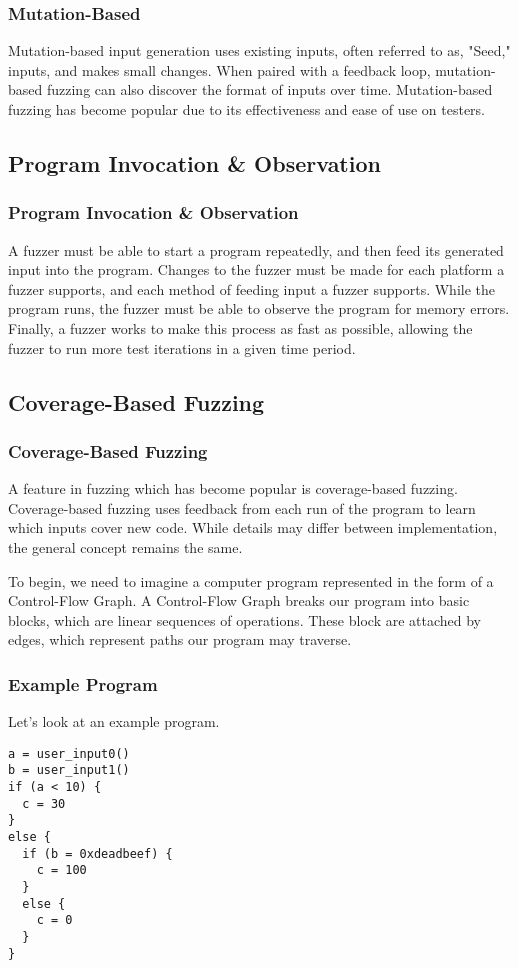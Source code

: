 \documentclass{beamer}
\begin{document}
\begin{frame}[fragile]
\frametitle{Mutation-Based}
Mutation-based input generation uses existing inputs, often referred to as, "Seed," inputs, and makes small changes. When paired with a feedback loop, mutation-based fuzzing can also discover the format of inputs over time. Mutation-based fuzzing has become popular due to its effectiveness and ease of use on testers.
\end{frame}


\subsection{Program Invocation {\&} Observation}
\begin{frame}
\frametitle{Program Invocation {\&} Observation}
A fuzzer must be able to start a program repeatedly, and then feed its generated input into the program. Changes to the fuzzer must be made for each platform a fuzzer supports, and each method of feeding input a fuzzer supports. While the program runs, the fuzzer must be able to observe the program for memory errors. Finally, a fuzzer works to make this process as fast as possible, allowing the fuzzer to run more test iterations in a given time period.
\end{frame}


\subsection{Coverage-Based Fuzzing}
\begin{frame}
\frametitle{Coverage-Based Fuzzing}
A feature in fuzzing which has become popular is coverage-based fuzzing. Coverage-based fuzzing uses feedback from each run of the program to learn which inputs cover new code. While details may differ between implementation, the general concept remains the same.

To begin, we need to imagine a computer program represented in the form of a Control-Flow Graph. A Control-Flow Graph breaks our program into basic blocks, which are linear sequences of operations. These block are attached by edges, which represent paths our program may traverse.
\end{frame}


\begin{frame}[fragile]
\frametitle{Example Program}
Let's look at an example program.
\begin{lstlisting}[breaklines=false]
a = user_input0()
b = user_input1()
if (a < 10) {
  c = 30
}
else {
  if (b = 0xdeadbeef) {
    c = 100
  }
  else {
    c = 0
  }
}
\end{lstlisting}
\end{frame}
\end{document}
